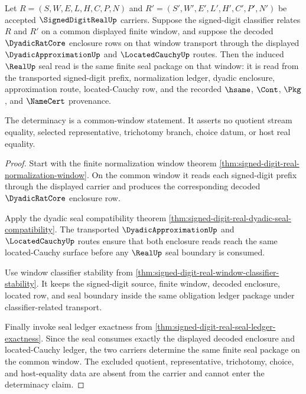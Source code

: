 \begin{theorem}
\label{thm:signed-digit-real-common-window-seal-determinacy}
Let $R=(S,W,E,L,H,C,P,N)$ and $R'=(S',W',E',L',H',C',P',N')$ be accepted $\SignedDigitRealUp$ carriers. Suppose the signed-digit classifier relates $R$ and $R'$ on a common displayed finite window, and suppose the decoded $\DyadicRatCore$ enclosure rows on that window transport through the displayed $\DyadicApproximationUp$ and $\LocatedCauchyUp$ routes. Then the induced $\RealUp$ seal read is the same finite seal package on that window: it is read from the transported signed-digit prefix, normalization ledger, dyadic enclosure, approximation route, located-Cauchy row, and the recorded $\hsame$, $\Cont$, $\Pkg$, and $\NameCert$ provenance.

The determinacy is a common-window statement. It asserts no quotient stream equality, selected representative, trichotomy branch, choice datum, or host real equality.
\end{theorem}
\begin{proof}
Start with the finite normalization window theorem \autoref{thm:signed-digit-real-normalization-window}. On the common window it reads each signed-digit prefix through the displayed carrier and produces the corresponding decoded $\DyadicRatCore$ enclosure row.

Apply the dyadic seal compatibility theorem \autoref{thm:signed-digit-real-dyadic-seal-compatibility}. The transported $\DyadicApproximationUp$ and $\LocatedCauchyUp$ routes ensure that both enclosure reads reach the same located-Cauchy surface before any $\RealUp$ seal boundary is consumed.

Use window classifier stability from \autoref{thm:signed-digit-real-window-classifier-stability}. It keeps the signed-digit source, finite window, decoded enclosure, located row, and seal boundary inside the same obligation ledger package under classifier-related transport.

Finally invoke seal ledger exactness from \autoref{thm:signed-digit-real-seal-ledger-exactness}. Since the seal consumes exactly the displayed decoded enclosure and located-Cauchy ledger, the two carriers determine the same finite seal package on the common window. The excluded quotient, representative, trichotomy, choice, and host-equality data are absent from the carrier and cannot enter the determinacy claim.
\end{proof}

